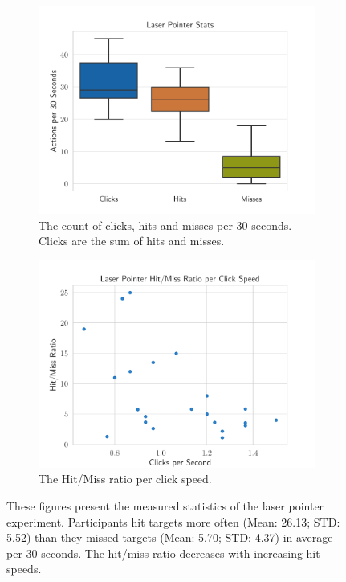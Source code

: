 \begin{figure}[H]
	\centering
	\begin{subfigure}[t]{.48\linewidth}%
		\centering
		\includegraphics[width=\linewidth]{figures/evaluation/eval_exp_lp.pdf}
		\caption{The count of clicks, hits and misses per 30 seconds. Clicks are the sum of hits and misses.}\label{fig:eval-exp-lp}
	\end{subfigure}%
	\hspace{0.02\linewidth}%
	\begin{subfigure}[t]{.48\linewidth}%
		\centering
		\includegraphics[width=\linewidth]{figures/evaluation/eval_exp_lp_ratio_scatter.pdf}
		\caption{The Hit/Miss ratio per click speed.}\label{fig:eval-exp-lp-ratio-scatter} %
	\end{subfigure}%
	\caption[Laser pointer task results]{These figures present the measured statistics of the laser pointer experiment. Participants hit targets more often (Mean: 26.13; \gls{STD}: 5.52) than they missed targets (Mean: 5.70; \gls{STD}: 4.37) in average per 30 seconds. The hit/miss ratio decreases with increasing hit speeds.}\label{fig:exp-lp-eval}
\end{figure}

